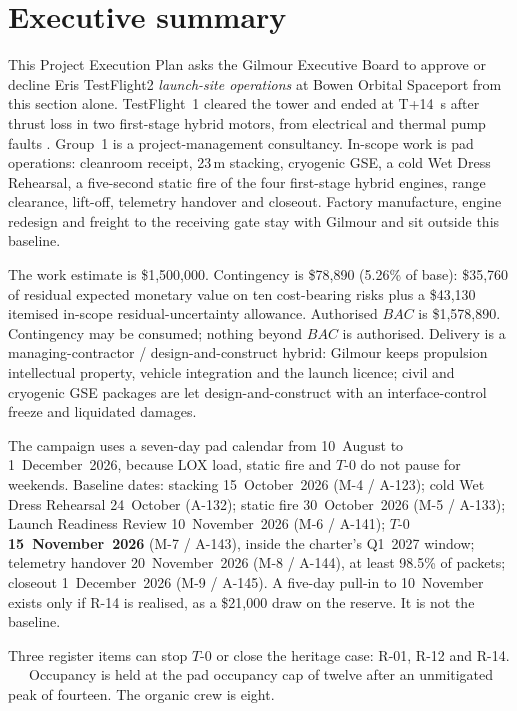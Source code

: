 \section{Executive summary}
\label{sec:exec}


This Project Execution Plan asks the Gilmour Executive Board to approve or decline Eris TestFlight2 \emph{launch-site operations} at Bowen Orbital Spaceport from this section alone. TestFlight~1 cleared the tower and ended at T+14~s after thrust loss in two first-stage hybrid motors, from electrical and thermal pump faults \citep{smith2025,gilmour2025,dougherty2026}. Group~1 is a project-management consultancy. In-scope work is pad operations: cleanroom receipt, 23\,m stacking, cryogenic GSE, a cold Wet Dress Rehearsal, a five-second static fire of the four first-stage hybrid engines, range clearance, lift-off, telemetry handover and closeout. Factory manufacture, engine redesign and freight to the receiving gate stay with Gilmour and sit outside this baseline.

The work estimate is \$1{,}500{,}000. Contingency is \$78{,}890 (5.26\% of base): \$35{,}760 of residual expected monetary value on ten cost-bearing risks plus a \$43{,}130 itemised in-scope residual-uncertainty allowance. Authorised $BAC$ is \$1{,}578{,}890. Contingency may be consumed; nothing beyond $BAC$ is authorised. Delivery is a managing-contractor / design-and-construct hybrid: Gilmour keeps propulsion intellectual property, vehicle integration and the launch licence; civil and cryogenic GSE packages are let design-and-construct with an interface-control freeze and liquidated damages.

The campaign uses a seven-day pad calendar from 10~August to 1~December~2026, because LOX load, static fire and $T$-0 do not pause for weekends. Baseline dates: stacking 15~October~2026 (M-4 / A-123); cold Wet Dress Rehearsal 24~October (A-132); static fire 30~October~2026 (M-5 / A-133); Launch Readiness Review 10~November~2026 (M-6 / A-141); $T$-0 \textbf{15~November~2026} (M-7 / A-143), inside the charter's Q1~2027 window; telemetry handover 20~November~2026 (M-8 / A-144), at least 98.5\% of packets; closeout 1~December~2026 (M-9 / A-145). A five-day pull-in to 10~November exists only if R-14 is realised, as a \$21{,}000 draw on the reserve. It is not the baseline.

Three register items can stop $T$-0 or close the heritage case: R-01, R-12 and R-14. \PEPrOiBoard\ \PEPrIxBoard\ \PEPrXivBoard\ Occupancy is held at the pad occupancy cap of twelve after an unmitigated peak of fourteen. The organic crew is eight.

\noindent\textit{\PEPrecommendation}
